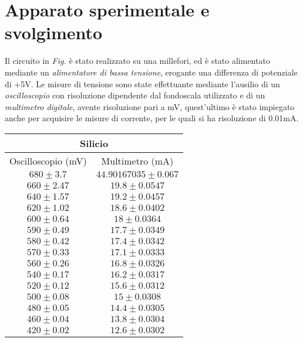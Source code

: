 \documentclass[@SRC@/main]{subfiles}
\begin{document}
\section{Apparato sperimentale e svolgimento} \label{sec:acquisizione}
  Il circuito in \textit{Fig.\!\!} è stato realizzato su una millefori, ed è stato alimentato mediante un \textit{alimentatore di bassa tensione}, erogante una differenza di potenziale di +5V. 
  Le misure di tensione sono state effettuante mediante l'ausilio di un \textit{oscilloscopio} con risoluzione dipendente dal fondoscala utilizzato e di un \textit{multimetro digitale}, avente risoluzione pari a  mV, quest'ultimo è stato impiegato anche per acquisire le misure di corrente, per le quali si ha risoluzione di 0.01mA.
  
  
  \begin{center}
    \begin{tabular}{ ||c|c|| }
        \hline
        \multicolumn{2}{||c||}{Silicio}\\
        \hline
        Oscilloscopio (mV) & Multimetro (mA) \\
        \hline
        $680\pm 3.7 $ & $44.90167035\pm 0.067$ \\
        \hline
        $660\pm 2.47$ & $19.8\pm 0.0547$ \\
        \hline
        $640\pm 1.57$ & $19.2\pm 0.0457$ \\
        \hline
        $620\pm 1.02$ & $18.6\pm0.0402$\\
        \hline
        $600\pm  0.64$ & $18\pm0.0364$ \\
        \hline
        $590\pm 0.49 $ & $17.7\pm0.0349$ \\
        \hline
        $580\pm 0.42 $ & $17.4\pm0.0342$ \\
        \hline
        $570\pm 0.33 $ & $17.1\pm0.0333$ \\
        \hline
        $560\pm 0.26 $ & $16.8\pm0.0326$ \\
        \hline
        $540\pm 0.17 $ & $16.2\pm0.0317$ \\
        \hline
        $520\pm 0.12 $ & $15.6\pm0.0312$ \\
        \hline 
        $500\pm 0.08 $ & $ 15\pm0.0308$ \\
        \hline 
        $480\pm 0.05 $ & $14.4\pm0.0305$ \\
        \hline 
        $460\pm 0.04 $ & $ 13.8\pm0.0304$ \\
        \hline 
        $420\pm 0.02 $ & $12.6 \pm0.0302$ \\
        \hline 
        
        
    \end{tabular}   
\end{center}
\end{document}
